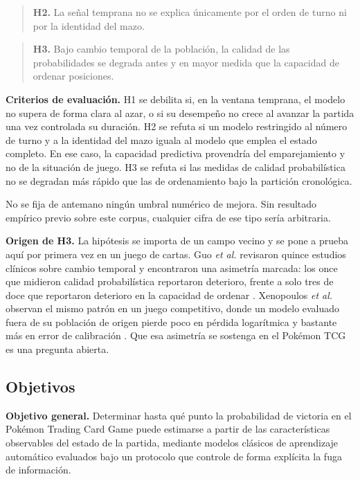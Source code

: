 \begin{quote}
\textbf{H2.} La señal temprana no se explica únicamente por el orden de
turno ni por la identidad del mazo.
\end{quote}

\begin{quote}
\textbf{H3.} Bajo cambio temporal de la población, la calidad de las
probabilidades se degrada antes y en mayor medida que la capacidad de
ordenar posiciones.
\end{quote}

\noindent\textbf{Criterios de evaluación.} H1 se debilita si, en la ventana
temprana, el modelo no supera de forma clara al azar, o si su desempeño no
crece al avanzar la partida una vez controlada su duración. H2 se refuta si
un modelo restringido al número de turno y a la identidad del mazo iguala al
modelo que emplea el estado completo. En ese caso, la capacidad predictiva
provendría del emparejamiento y no de la situación de juego. H3 se refuta si
las medidas de calidad probabilística no se degradan más rápido que las de
ordenamiento bajo la partición cronológica.

No se fija de antemano ningún umbral numérico de mejora. Sin resultado
empírico previo sobre este corpus, cualquier cifra de ese tipo sería
arbitraria.

\noindent\textbf{Origen de H3.} La hipótesis se importa de un campo vecino y
se pone a prueba aquí por primera vez en un juego de cartas. Guo \textit{et
al.} revisaron quince estudios clínicos sobre cambio temporal y encontraron
una asimetría marcada: los once que midieron calidad probabilística
reportaron deterioro, frente a solo tres de doce que reportaron deterioro en
la capacidad de ordenar \cite{guo_temporalshift_2021}. Xenopoulos \textit{et
al.} observan el mismo patrón en un juego competitivo, donde un modelo
evaluado fuera de su población de origen pierde poco en pérdida logarítmica
y bastante más en error de calibración \cite{xenopoulos_winprob_2022}. Que
esa asimetría se sostenga en el Pok\'emon TCG es una pregunta abierta.

\subsection{Objetivos}
\label{subsec:objetivos}

\noindent\textbf{Objetivo general.} Determinar hasta qué punto la
probabilidad de victoria en el Pok\'emon Trading Card Game puede estimarse a
partir de las características observables del estado de la partida, mediante
modelos clásicos de aprendizaje automático evaluados bajo un protocolo que
controle de forma explícita la fuga de información.

